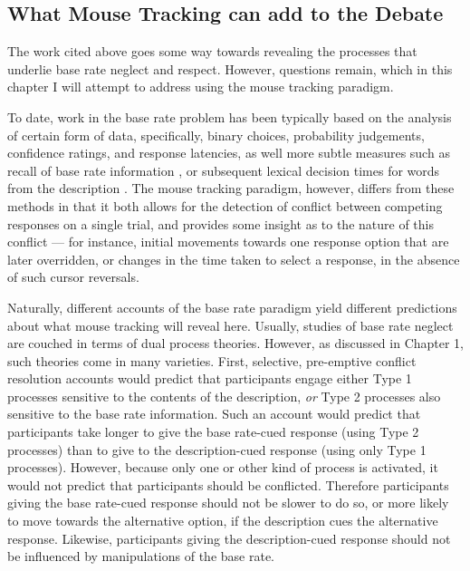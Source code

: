 \subsection{What Mouse Tracking can add to the Debate}

The work cited above goes some way towards revealing the processes
that underlie base rate neglect and respect.
However, questions remain, which in this chapter
I will attempt to address using the mouse tracking paradigm.

To date, work in the base rate problem has been typically based
on the analysis of certain form of data,
specifically, binary choices, probability judgements,
confidence ratings, and response latencies,
as well more subtle measures such as
recall of base rate information \citep{DeNeys2008},
or subsequent lexical decision times for words from the description \citep{DeNeys2009a}.
The mouse tracking paradigm, however, differs from these methods
in that it both allows for the detection of conflict 
between competing responses on a single trial,
and provides some insight as to the nature of this conflict ---
for instance, initial movements towards one response option that are later overridden,
or changes in the time taken to select a response,
in the absence of such cursor reversals.



Naturally, different accounts of the base rate paradigm
yield different predictions about what mouse tracking will reveal here.
Usually, studies of base rate neglect
are couched in terms of dual process theories.
However, as discussed in Chapter 1, such theories come in many varieties.
First, selective, pre-emptive conflict resolution accounts
\citep[e.g.][]{Klaczynski2000}
would predict that participants engage either Type 1 processes
sensitive to the contents of the description,
\emph{or} Type 2 processes also sensitive to the base rate information.
Such an account would predict that participants take longer
to give the base rate-cued response (using Type 2 processes)
than to give to the description-cued response (using only Type 1 processes).
However, because only one or other kind of process is activated,
it would not predict that participants should be conflicted.
Therefore participants giving the base rate-cued response
should not be slower to do so,
or more likely to move towards the alternative option,
if the description cues the alternative response.
Likewise, participants giving the description-cued response
should not be influenced by manipulations of the base rate.

